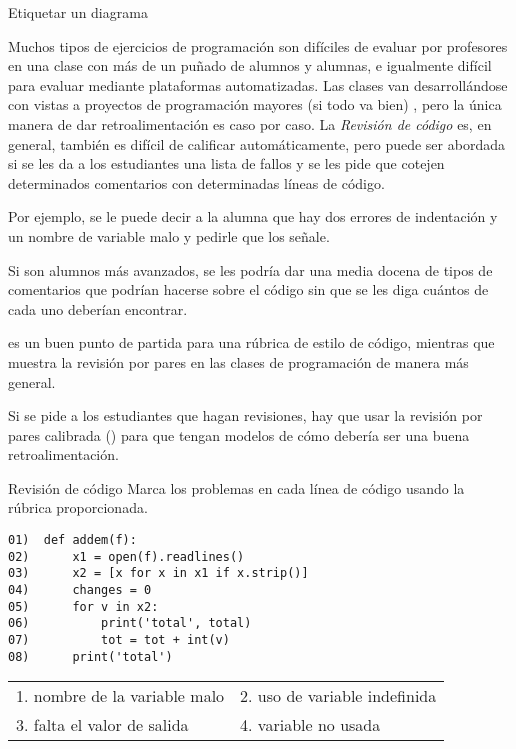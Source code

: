 \begin{aside}{Etiquetar un diagrama}
{

Muchos tipos de ejercicios de programación son difíciles de evaluar por profesores en una clase con más de un puñado de alumnos y alumnas, e igualmente difícil para evaluar mediante plataformas automatizadas.
Las clases van desarrollándose con vistas a proyectos de programación mayores (si todo va bien) , 
pero la única manera de dar retroalimentación es caso por caso.
La \emph{Revisión de código} es, en general, también es difícil de calificar automáticamente,
pero puede ser abordada si se les da a los estudiantes una lista de fallos y se les pide que cotejen determinados comentarios con determinadas líneas de código.

Por ejemplo, 
se le puede decir a la alumna que hay dos errores de indentación y un nombre de variable malo y pedirle que los señale.

Si son alumnos más avanzados, se les podría dar una media docena de tipos de comentarios que podrían hacerse sobre el código sin que se les diga cuántos de cada uno deberían encontrar.

\cite{Steg2016b} es un buen punto de partida para una rúbrica de estilo de código, mientras que~\cite{Luxt2009} muestra la revisión por pares en las clases de programación de manera más general.

Si se pide a los estudiantes que hagan revisiones, hay que usar la revisión por pares calibrada () para que tengan modelos de cómo debería ser una buena retroalimentación.

\begin{aside}{Revisión de código}
 Marca los problemas en cada línea de código usando la rúbrica proporcionada.

\begin{verbatim}
01)  def addem(f):
02)      x1 = open(f).readlines()
03)      x2 = [x for x in x1 if x.strip()]
04)      changes = 0
05)      for v in x2:
06)          print('total', total)
07)          tot = tot + int(v)
08)      print('total')
\end{verbatim}

   \begin{longtable}{ll}
    1. nombre de la variable malo   & 2. uso de variable indefinida \\
    3. falta el valor de salida & 4. variable no usada
  \end{longtable}

\end{aside}

}
\end{aside}
